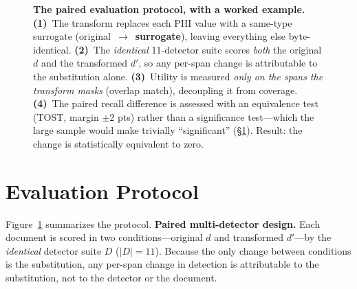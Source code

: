 \documentclass[pmlr,twocolumn,10pt]{jmlr}
\newcommand{\oldv}[1]{\textcolor{cclay}{#1}}
\newcommand{\newv}[1]{\textcolor{caccent}{\textbf{#1}}}
\begin{document}
\begin{figure}[t]
\caption{\textbf{The paired evaluation protocol, with a worked example.} \textbf{(1)}~The transform replaces each PHI value with a same-type surrogate (\oldv{original}~$\rightarrow$~\newv{surrogate}), leaving everything else byte-identical. \textbf{(2)}~The \emph{identical} 11-detector suite scores \emph{both} the original $d$ and the transformed $d'$, so any per-span change is attributable to the substitution alone. \textbf{(3)}~Utility is measured \emph{only on the spans the transform masks} (overlap match), decoupling it from coverage. \textbf{(4)}~The paired recall difference is assessed with an equivalence test (TOST, margin $\pm2$ pts) rather than a significance test---which the large sample would make trivially ``significant'' (\S\ref{sec:protocol}). Result: the change is statistically equivalent to zero.}
\label{fig:protocol}
\end{figure}

\section{Evaluation Protocol}\label{sec:protocol}
Figure~\ref{fig:protocol} summarizes the protocol. \textbf{Paired multi-detector design.} Each document is scored in two conditions---original $d$ and transformed $d'$---by the \emph{identical} detector suite $D$ ($|D|=11$). Because the only change between conditions is the substitution, any per-span change in detection is attributable to the substitution, not to the detector or the document.
\end{document}
